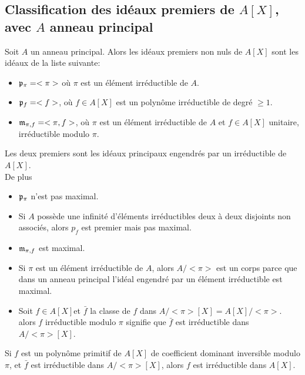 \subsection{Classification des idéaux premiers de $A[X]$, avec $A$ anneau principal}

\begin{theorem}
	Soit $A$ un anneau principal. Alors les idéaux premiers non nuls de $A[X]$ sont les idéaux de la liste suivante:
	\begin{itemize}
		\item $\mathfrak{p}_{\pi} = <\pi>$ où $\pi$ est un élément irréductible de $A$.
		\item $\mathfrak{p}_f = <f>$, où $f \in A[X]$ est un polynôme irréductible de degré $\geq 1$.
		\item $\mathfrak{m}_{\pi,f} = <\pi,f>$, où $\pi$ est un élément irréductible de $A$ et $f \in A[X]$ unitaire, irréductible modulo $\pi$.
	\end{itemize}
	Les deux premiers sont les idéaux principaux engendrés par un irréductible de $A[X]$.\\
	De plus
	\begin{itemize}
		\item $\mathfrak{p}_{\pi}$ n'est pas maximal.
		\item Si $A$ possède une infinité d'éléments irréductibles deux à deux disjoints non associés, alors $p_f$ est premier mais pas maximal.
		\item $\mathfrak{m}_{\pi,f}$ est maximal.
	\end{itemize}
\end{theorem}


\begin{rappel}[Irréductibilité]
	\begin{itemize}
		\item
		      Si $\pi$ est un élément irréductible de $A$, alors $A/<\pi>$ est un corps parce que dans un anneau
		      principal l'idéal engendré par un élément irréductible est maximal.\\
		\item Soit  $f \in A[X]$et $\bar{f}$ la classe de $f$ dans $A/<\pi>[X] = A[X]/<\pi>$.\\
		      alors $f$ irréductible modulo $\pi$ signifie que $\bar{f}$ est irréductible dans $A/<\pi>[X]$.
	\end{itemize}
\end{rappel}

\begin{rappel}
	Si $f$ est un polynôme primitif de $A[X]$ de coefficient dominant inversible modulo $\pi$, et $\bar{f}$ est irréductible dans $A/<\pi>[X]$, alors $f$ est irréductible dans $A[X]$.
\end{rappel}

